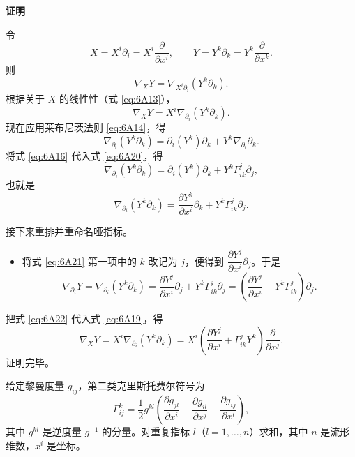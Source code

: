 \noindent\textbf{证明}\par
令
\begin{equation*}
  X=X^i\partial_i=X^i\frac{\partial}{\partial x^i},\qquad
  Y=Y^k\partial_k=Y^k\frac{\partial}{\partial x^k}.
  \tag{6A17}\label{eq:6A17}
\end{equation*}
则
\begin{equation*}
  \nabla_XY=\nabla_{X^i\partial_i}(Y^k\partial_k).
  \tag{6A18}\label{eq:6A18}
\end{equation*}
根据关于 $X$ 的线性性（式 \eqref{eq:6A13}），
\begin{equation*}
  \nabla_XY=X^i\nabla_{\partial_i}(Y^k\partial_k).
  \tag{6A19}\label{eq:6A19}
\end{equation*}
现在应用莱布尼茨法则 \eqref{eq:6A14}，得
\begin{equation*}
  \nabla_{\partial_i}(Y^k\partial_k)=\partial_i(Y^k)\partial_k
      +Y^k\nabla_{\partial_i}\partial_k.
  \tag{6A20}\label{eq:6A20}
\end{equation*}
将式 \eqref{eq:6A16} 代入式 \eqref{eq:6A20}，得
\[
  \nabla_{\partial_i}(Y^k\partial_k)=\partial_i(Y^k)\partial_k
    +Y^k\Gamma^j_{ik}\partial_j,
\]
也就是
\begin{equation*}
  \nabla_{\partial_i}(Y^k\partial_k)=\frac{\partial Y^k}{\partial x^i}\partial_k
    +Y^k\Gamma^j_{ik}\partial_j.
  \tag{6A21}\label{eq:6A21}
\end{equation*}

接下来重排并重命名哑指标。
\begin{itemize}
\item 将式 \eqref{eq:6A21} 第一项中的 $k$ 改记为 $j$，便得到 $\dfrac{\partial Y^j}{\partial x^i}\partial_j$。于是
\begin{equation*}
  \nabla_{\partial_i}Y
  =\nabla_{\partial_i}(Y^k\partial_k)
  =\frac{\partial Y^j}{\partial x^i}\partial_j+Y^k\Gamma^j_{ik}\partial_j
  =\left(\frac{\partial Y^j}{\partial x^i}+Y^k\Gamma^j_{ik}\right)\partial_j.
  \tag{6A22}\label{eq:6A22}
\end{equation*}
\end{itemize}
把式 \eqref{eq:6A22} 代入式 \eqref{eq:6A19}，得
\[
  \nabla_XY=X^i\nabla_{\partial_i}(Y^k\partial_k)
    =X^i\left(\frac{\partial Y^j}{\partial x^i}+\Gamma^j_{ik}Y^k\right)
     \frac{\partial}{\partial x^j}.
\]
证明完毕。

给定黎曼度量 $g_{ij}$，第二类克里斯托费尔符号为
\begin{equation*}
  \Gamma^k_{ij}
   =\frac12 g^{kl}\left(\frac{\partial g_{jl}}{\partial x^i}
       +\frac{\partial g_{il}}{\partial x^j}
       -\frac{\partial g_{ij}}{\partial x^l}\right),
  \tag{6A23}\label{eq:6A23}
\end{equation*}
其中 $g^{kl}$ 是逆度量 $g^{-1}$ 的分量。对重复指标 $l$（$l=1,\dots,n$）求和，其中 $n$ 是流形维数，$x^i$ 是坐标。

